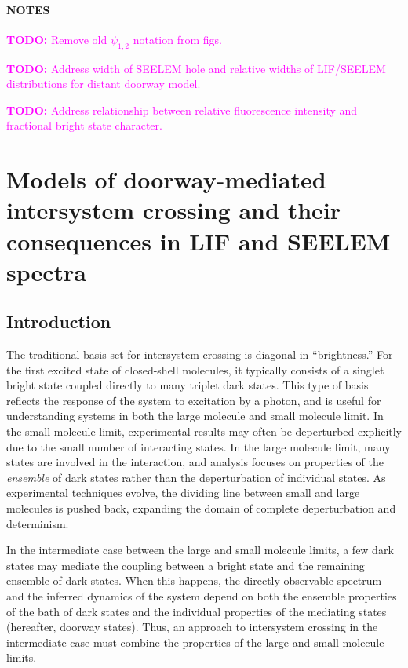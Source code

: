 \documentclass[12pt]{mitthesis}
\newcommand{\TODO} [1]{\textcolor{magenta}{\textbf{TODO:} #1}}
\begin{document}
\tableofcontents
\clearpage
\subsubsection*{NOTES}

\TODO{Remove old $\psi_{1,2}$ notation from figs.}

\TODO{Address width of SEELEM hole and relative widths of LIF/SEELEM
  distributions for distant doorway model.}

\TODO{Address relationship between relative fluorescence intensity and
  fractional bright state character.}

 \clearpage

 \chapter{Models of doorway-mediated intersystem crossing and their
   consequences in LIF and SEELEM spectra}
\label{chapter:models}

\section{Introduction}

The traditional basis set for intersystem crossing is diagonal in
``brightness.'' For the first excited state of closed-shell molecules,
it typically consists of a singlet bright state coupled directly to
many triplet dark states. This type of basis reflects the response of
the system to excitation by a photon, and is useful for understanding
systems in both the large molecule and small molecule limit. In the
small molecule limit, experimental results may often be deperturbed
explicitly due to the small number of interacting states. In the large
molecule limit, many states are involved in the interaction, and
analysis focuses on properties of the \emph{ensemble} of dark states
rather than the deperturbation of individual states.  As experimental
techniques evolve, the dividing line between small and large molecules
is pushed back, expanding the domain of complete deperturbation and
determinism.

In the intermediate case between the large and small molecule limits,
a few dark states may mediate the coupling between a bright state and
the remaining ensemble of dark states. When this happens, the directly
observable spectrum and the inferred dynamics of the system depend on
both the ensemble properties of the bath of dark states and the
individual properties of the mediating states (hereafter, doorway
states). Thus, an approach to intersystem crossing in the intermediate
case must combine the properties of the large and small molecule
limits.
\end{document}
